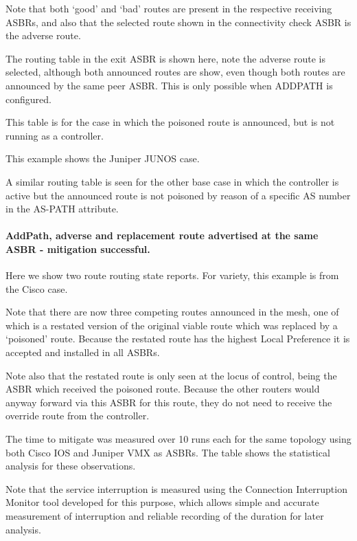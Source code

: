 Note that both `good' and `bad' routes are present in the respective receiving ASBRs, and also that the selected route shown in the connectivity check ASBR is the adverse route.

The routing table in the exit ASBR is shown here, note the adverse route is selected, although both announced routes are show, even though both routes are announced by the same peer ASBR.  This is only possible when ADDPATH is configured.

This table is for the case in which the poisoned route is announced, but \hbgp is not running as a controller.

This example shows the Juniper JUNOS case.

A similar routing table is seen for the other base case in which the \hbgp controller is active but the announced route is not poisoned by reason of a specific AS number in the AS-PATH attribute.

\paragraph{AddPath, adverse and replacement route advertised at the same ASBR - mitigation successful.}

Here we show two route routing state reports.  For variety, this example is from the Cisco case.

Note that there are now three competing routes announced in the mesh, one of which is a restated version of the original viable route which was replaced by a `poisoned' route.  Because the restated route has the highest Local Preference it is accepted and installed in all ASBRs.

Note also that the restated route is only seen at the locus of control, being the ASBR which received the poisoned route.  Because the other routers would anyway forward via this ASBR for this route, they do not need to receive the override route from the controller.

The time to mitigate was measured over 10 runs each for the same topology using both Cisco IOS and Juniper VMX as ASBRs.  The table shows the statistical analysis for these observations.

Note that the service interruption is measured using the Connection Interruption Monitor tool developed for this purpose, which allows simple and accurate measurement of interruption and reliable recording of the duration for later analysis.



